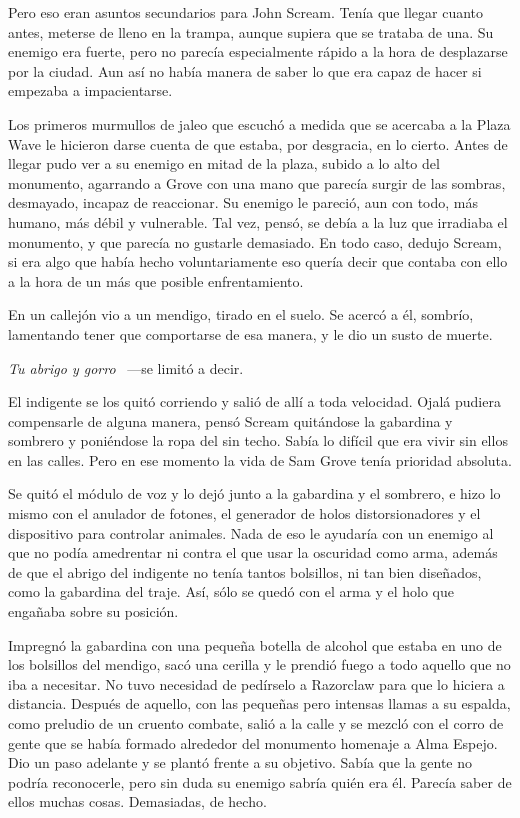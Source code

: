 Pero eso eran asuntos secundarios para John Scream. Tenía que llegar cuanto antes, meterse de lleno en la trampa, aunque supiera que se trataba de una. Su enemigo era fuerte, pero no parecía especialmente rápido a la hora de desplazarse por la ciudad. Aun así no había manera de saber lo que era capaz de hacer si empezaba a impacientarse.

Los primeros murmullos de jaleo que escuchó a medida que se acercaba a la Plaza Wave le hicieron darse cuenta de que estaba, por desgracia, en lo cierto. Antes de llegar pudo ver a su enemigo en mitad de la plaza, subido a lo alto del monumento, agarrando a Grove con una mano que parecía surgir de las sombras, desmayado, incapaz de reaccionar. Su enemigo le pareció, aun con todo, más humano, más débil y vulnerable. Tal vez, pensó, se debía a la luz que irradiaba el monumento, y que parecía no gustarle demasiado. En todo caso, dedujo Scream, si era algo que había hecho voluntariamente eso quería decir que contaba con ello a la hora de un más que posible enfrentamiento.

En un callejón vio a un mendigo, tirado en el suelo. Se acercó a él, sombrío, lamentando tener que comportarse de esa manera, y le dio un susto de muerte.

\emph{Tu abrigo y gorro} ~---se limitó a decir.

El indigente se los quitó corriendo y salió de allí a toda velocidad. Ojalá pudiera compensarle de alguna manera, pensó Scream quitándose la gabardina y sombrero y poniéndose la ropa del sin techo. Sabía lo difícil que era vivir sin ellos en las calles. Pero en ese momento la vida de Sam Grove tenía prioridad absoluta.

Se quitó el módulo de voz y lo dejó junto a la gabardina y el sombrero, e hizo lo mismo con el anulador de fotones, el generador de holos distorsionadores y el dispositivo para controlar animales. Nada de eso le ayudaría con un enemigo al que no podía amedrentar ni contra el que usar la oscuridad como arma, además de que el abrigo del indigente no tenía tantos bolsillos, ni tan bien diseñados, como la gabardina del traje. Así, sólo se quedó con el arma y el holo que engañaba sobre su posición.

Impregnó la gabardina con una pequeña botella de alcohol que estaba en uno de los bolsillos del mendigo, sacó una cerilla y le prendió fuego a todo aquello que no iba a necesitar. No tuvo necesidad de pedírselo a Razorclaw para que lo hiciera a distancia. Después de aquello, con las pequeñas pero intensas llamas a su espalda, como preludio de un cruento combate, salió a la calle y se mezcló con el corro de gente que se había formado alrededor del monumento homenaje a Alma Espejo. Dio un paso adelante y se plantó frente a su objetivo. Sabía que la gente no podría reconocerle, pero sin duda su enemigo sabría quién era él. Parecía saber de ellos muchas cosas. Demasiadas, de hecho.

